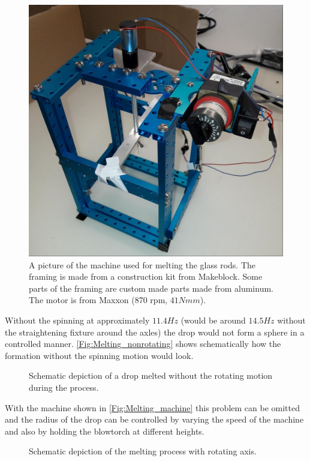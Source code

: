 \begin{figure}[H]
	\includegraphics[scale=0.3]{source/melting_machine}
	\caption{A picture of the machine used for melting the glass rods. The framing is made from a construction kit from Makeblock. Some parts of the framing are custom made parts made from aluminum. The motor is from Maxxon (870 rpm, $41 \si{Nmm}$).}
	\label{Fig:Melting_machine}
\end{figure}
Without the spinning at approximately $11.4\si{Hz}$ (would be around $14.5\si{Hz}$ without the straightening fixture around the axles) the drop would not form a sphere in a controlled manner. \autoref{Fig:Melting_nonrotating} shows schematically how the formation without the spinning motion would look.
\begin{figure}[H]
	
	\caption{Schematic depiction of a drop melted without the rotating motion during the process.}
	\label{Fig:Melting_nonrotating}
\end{figure}
With the machine shown in \autoref{Fig:Melting_machine} this problem can be omitted and the radius of the drop can be controlled by varying the speed of the machine and also by holding the blowtorch at different heights.
\begin{figure}[H]
	
	\caption{Schematic depiction of the melting process with rotating axis.}
\end{figure}
